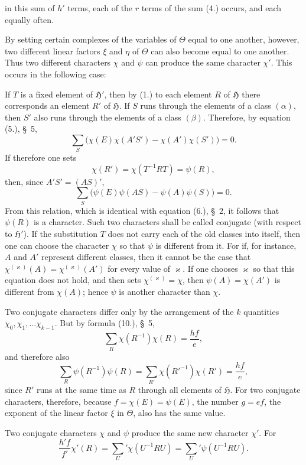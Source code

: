\documentclass[11pt]{article}
\newcommand{\grp}{\mathfrak{H}}
\begin{document}
in this sum of $h'$ terms, each of the $r$ terms of the sum (4.) occurs, and each equally often.

By setting certain complexes of the variables of $\Theta$ equal to one another, however, two different linear factors $\xi$ and $\eta$ of $\Theta$ can also become equal to one another. Thus two different characters $\chi$ and $\psi$ can produce the same character $\chi'$. This occurs in the following case:

If $T$ is a fixed element of $\grp'$, then by (1.) to each element $R$ of $\grp$ there corresponds an element $R'$ of $\grp$. If $S$ runs through the elements of a class $(\alpha)$, then $S'$ also runs through the elements of a class $(\beta)$. Therefore, by equation (5.), \S~5,
\[
\sum_S\bigl(\chi(E)\chi(A'S')-\chi(A')\chi(S')\bigr)=0.
\]
If therefore one sets
\[
\chi(R')=\chi(T^{-1}RT)=\psi(R),
\]
then, since $A'S'=(AS)'$,
\[
\sum_S\bigl(\psi(E)\psi(AS)-\psi(A)\psi(S)\bigr)=0.
\]
From this relation, which is identical with equation (6.), \S~2, it follows that $\psi(R)$ is a character. Such two characters shall be called conjugate (with respect to $\grp'$). If the substitution $T$ does not carry each of the old classes into itself, then one can choose the character $\chi$ so that $\psi$ is different from it. For if, for instance, $A$ and $A'$ represent different classes, then it cannot be the case that $\chi^{(\varkappa)}(A)=\chi^{(\varkappa)}(A')$ for every value of $\varkappa$. If one chooses $\varkappa$ so that this equation does not hold, and then sets $\chi^{(\varkappa)}=\chi$, then $\psi(A)=\chi(A')$ is different from $\chi(A)$; hence $\psi$ is another character than $\chi$.

Two conjugate characters differ only by the arrangement of the $k$ quantities $\chi_0,\chi_1,\ldots \chi_{k-1}$. But by formula (10.), \S~5,
\begin{equation*}\tag{6.}
\sum_R \chi(R^{-1})\chi(R)=\frac{hf}{e},
\end{equation*}
and therefore also
\[
\sum_R \psi(R^{-1})\psi(R)=\sum_{R'}\chi(R'^{-1})\chi(R')=\frac{hf}{e},
\]
since $R'$ runs at the same time as $R$ through all elements of $\grp$. For two conjugate characters, therefore, because $f=\chi(E)=\psi(E)$, the number $g=ef$, the exponent of the linear factor $\xi$ in $\Theta$, also has the same value.

Two conjugate characters $\chi$ and $\psi$ produce the same new character $\chi'$. For
\begin{equation*}\tag{7.}
\frac{h'f}{f'}\chi'(R)=\sum_U'\chi(U^{-1}RU)=\sum_U'\psi(U^{-1}RU).
\end{equation*}
\end{document}
